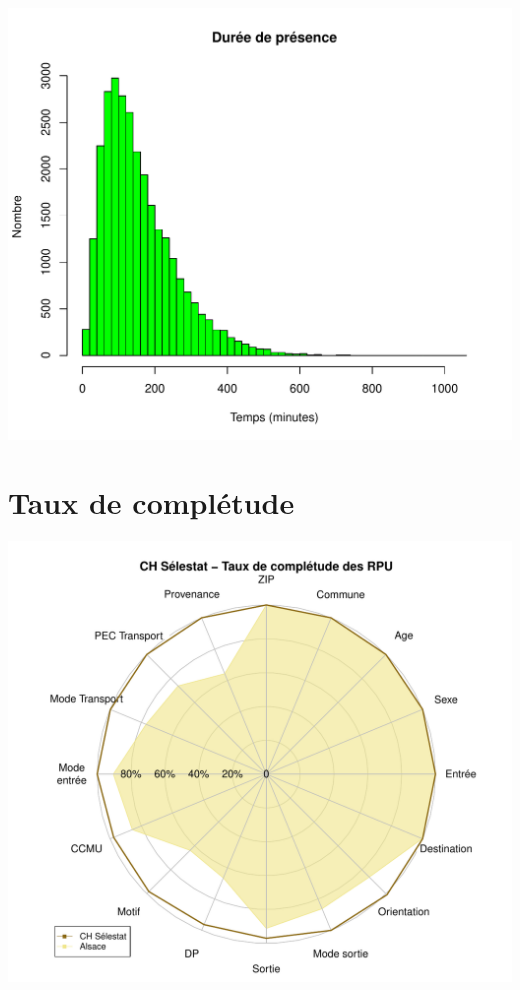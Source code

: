 \documentclass[12pt,english,french,twoside]{book}\usepackage[]{graphicx}\usepackage[]{color}
\makeatletter
\def\maxwidth{ %
  \ifdim\Gin@nat@width>\linewidth
    \linewidth
  \else
    \Gin@nat@width
  \fi
}
\newenvironment{knitrout}{}{} %
\makeatother
\begin{document}
\begin{knitrout}
\color{fgcolor}
\includegraphics[width=\maxwidth]{figure/graphe_p_sel-1} 

\end{knitrout}

\section*{Taux de complétude}

\begin{knitrout}
\color{fgcolor}
\includegraphics[width=\maxwidth]{figure/compl_sel-1} 

\end{knitrout}
\end{document}
